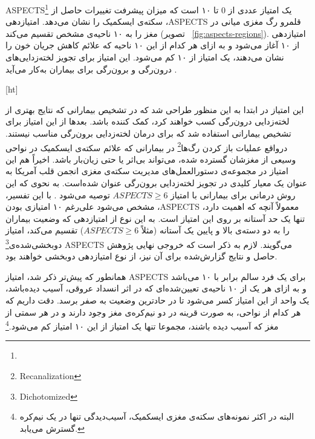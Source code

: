 
ASPECTS\footnote{}
یک امتیاز عددی از 0 تا ۱۰ است که میزان پیشرفت تغییرات حاصل از سکته‌ی ایسکمیک را 
نشان می‌دهد.
 امتیاز‌دهی ،ASPECTS 
 قلمرو رگ مغزی میانی در مغز را به ۱۰ ناحیه‌ی مشخص تقسیم می‌کند (تصویر ~\ref{fig:aspects-regions}).
 امتیازدهی  از ۱۰ آغاز می‌شود و به ازای هر کدام از این ۱۰ ناحیه که علائم کاهش جریان 
 خون را نشان می‌دهند، یک امتیاز از ۱۰ کم می‌شود.
 این امتیاز برای تجویز لخته‌زدایی‌های درون‌رگی و برون‌رگی برای بیماران به‌کار می‌آید \cite{mokin2017aspects}.



[ht]

این امتیاز 
در ابتدا به این منظور طراحی شد که 
در تشخیص بیمارانی که نتایج بهتری از لخته‌زدایی درون‌رگی
کسب خواهند کرد،‌ کمک کننده باشد.
بعد‌ها از این امتیاز برای تشخیص بیمارانی استفاده شد که برای درمان لخته‌زدایی برون‌رگی مناسب نیستند.
درواقع عملیات 
باز کردن رگ‌ها\footnote{Recanalization}
در بیمارانی که علائم سکته‌ی ایسکمیک در نواحی وسیعی از مغزشان گسترده شده، می‌تواند بی‌اثر یا حتی زیان‌بار باشد.
اخیراً هم این امتیاز در
مجموعه‌ی دستور‌العمل‌های مدیریت سکته‌ی مغزی
انجمن قلب آمریکا به عنوان 
 یک معیار کلیدی در تجویز 
 لخته‌زدایی برون‌رگی عنوان شده‌است.
 به نحوی که این روش درمانی برای بیمارانی با امتیاز $ASPECTS\geq 6$ توصیه می‌شود \cite{mokin2017aspects}.
با این تفسیر، مشخص می‌شود علی‌رغم ۱۰ امتیازی بودن ،ASPECTS معمولاً آنچه که اهمیت دارد، تنها یک حد آستانه بر روی این امتیاز است.
به این نوع از امتیازدهی که وضعیت بیماران را به دو دسته‌ی بالا و پایین یک آستانه (مثلاً $ASPECTS\geq6$) تقسیم می‌کند، امتیاز 
دوبخشی‌شده‌ی\footnote{Dichotomized}
ASPECTS می‌گویند.
لازم به ذکر است که خروجی نهایی پژوهش حاصل و نتایج گزارش‌شده برای آن نیز، از نوع امتیازدهی دو‌بخشی خواهند بود.


همانطور که پیش‌تر ذکر شد، امتیاز ASPECTS برای یک فرد سالم برابر با ۱۰ می‌باشد و به ازای هر یک از ۱۰ ناحیه‌ی تعیین‌شده‌ای که در اثر انسداد عروقی، آسیب دیده‌باشد، یک واحد از این امتیاز کسر می‌شود تا در حادترین وضعیت به صفر برسد.
دقت داریم که هر کدام از نواحی، به صورت قرینه در دو نیم‌کره‌ی مغز وجود دارند و در هر سمتی از مغز که آسیب دیده باشند، مجموعا تنها یک امتیاز از این ۱۰ امتیاز کم می‌شود.\footnote{البته در اکثر نمونه‌های سکته‌ی مغزی ایسکمیک، آسیب‌دیدگی تنها در یک نیم‌کره گسترش می‌یابد.}

